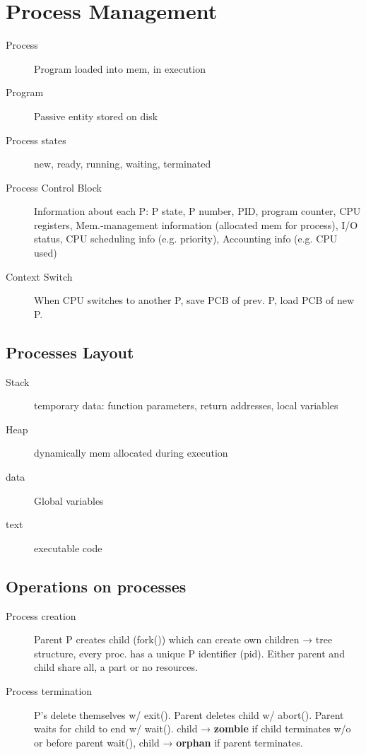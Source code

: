 \section*{Process Management}
\begin{description}
  \item[Process] Program loaded into mem, in execution
  \item[Program] Passive entity stored on disk
  \item[Process states] new, ready, running, waiting, terminated
  \item[Process Control Block] Information about each P: P state, P number, PID, program counter, CPU registers, Mem.-management information (allocated mem for process), I/O status, CPU scheduling info (e.g. priority), Accounting info (e.g. CPU used)
  \item[Context Switch] When CPU switches to another P, save PCB of prev. P, load PCB of new P.
\end{description}

\subsection*{Processes Layout}
\begin{description}
  \item[Stack] temporary data: function parameters, return addresses, local variables
  \item[Heap] dynamically mem allocated during execution
  \item[data] Global variables
  \item[text] executable code
\end{description}


\subsection*{Operations on processes}
\begin{description}
  \item[Process creation]Parent P creates child (fork()) which can create own children → tree structure, every proc. has a unique P identifier (pid). Either parent and child share all, a part or no resources.
  \item[Process termination] P's delete themselves w/ exit(). Parent deletes child w/ abort(). Parent waits for child to end w/ wait(). child → \textbf{zombie} if child terminates w/o or before parent wait(), child → \textbf{orphan} if parent terminates.
\end{description}


